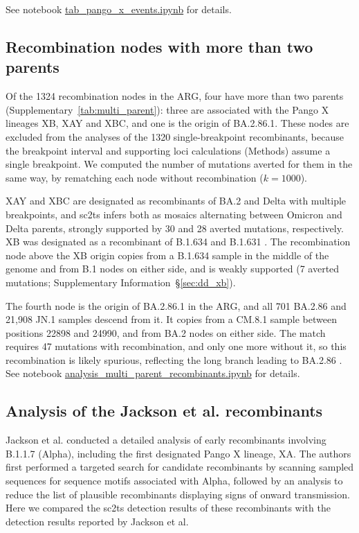 \documentclass[12pt]{article}
\newcommand{\supref}[1]{Supplementary Information~\S\ref{#1}}
\newcommand{\siref}[1]{Supplementary~\ref{#1}}
\begin{document}
See notebook
\href{https://github.com/jeromekelleher/sc2ts-paper/blob/main/notebooks/tab\_pango\_x\_events.ipynb}
{tab\_pango\_x\_events.ipynb} for details.

\subsection{Recombination nodes with more than two parents}
\label{sec:multi_parent_recombinants}
Of the 1324 recombination nodes in the ARG, four have more than two parents
(\siref{tab:multi_parent}): three are associated with the Pango X lineages
XB, XAY and XBC, and one is the origin of BA.2.86.1.
These nodes are excluded from the analyses of the 1320 single-breakpoint
recombinants, because the breakpoint interval and supporting loci
calculations (Methods) assume a single breakpoint.
We computed the number of mutations averted for them in the same way,
by rematching each node without recombination ($k=1000$).

XAY and XBC are designated as recombinants of BA.2 and Delta with multiple
breakpoints, and sc2ts infers both as mosaics alternating between Omicron and
Delta parents, strongly supported by 30 and 28 averted mutations, respectively.
XB was designated as a recombinant of B.1.634 and B.1.631 \cite{Gutierrez2022}.
The recombination node above the XB origin copies from a B.1.634 sample in the
middle of the genome and from B.1 nodes on either side, and is weakly
supported (7 averted mutations; \supref{sec:dd_xb}).

The fourth node is the origin of BA.2.86.1 in the ARG, and all 701 BA.2.86
and 21,908 JN.1 samples descend from it.
It copies from a CM.8.1 sample between positions 22898 and 24990, and from
BA.2 nodes on either side.
The match requires 47 mutations with recombination, and only one more
without it, so this recombination is likely spurious, reflecting the long
branch leading to BA.2.86 \cite{Planas2024}.
See notebook
\href{https://github.com/jeromekelleher/sc2ts-paper/blob/main/notebooks/analysis\_multi\_parent\_recombinants.ipynb}
{analysis\_multi\_parent\_recombinants.ipynb} for details.

\subsection{Analysis of the Jackson et al. recombinants}
\label{sec:jackson_recombs}

Jackson et al.\cite{Jackson2021} conducted a detailed analysis of
early recombinants involving B.1.1.7 (Alpha),
including the first designated Pango X lineage, XA.
The authors first performed a targeted search for candidate recombinants by
scanning sampled sequences for sequence motifs associated with Alpha,
followed by an analysis to reduce the list of plausible recombinants
displaying signs of onward transmission.
Here we compared the sc2ts detection results of these recombinants
with the detection results reported by Jackson et al.
\end{document}
